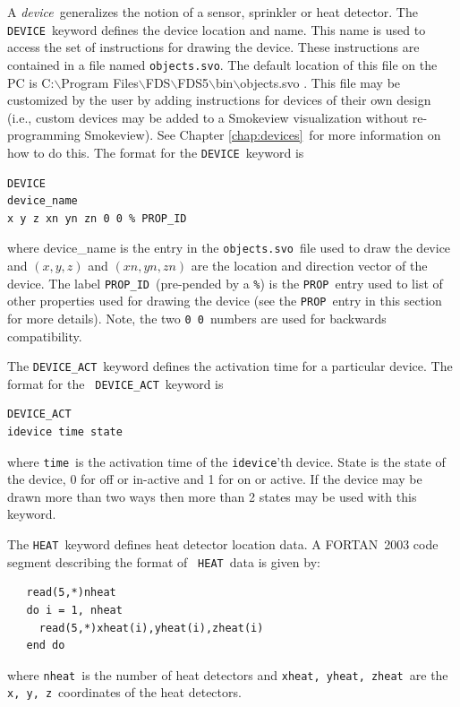 \documentclass[11pt,twoside]{book}
\begin{document}
A {\em device}\ generalizes the notion of a sensor,
sprinkler or heat detector.  The {\tt DEVICE}\ keyword defines the
device location and name.  This name is used to access the set of
instructions for drawing the device.  These instructions are
contained in a file named {\tt objects.svo}. The default location
of this file on the PC is
C:$\backslash$Program Files$\backslash$FDS$\backslash$FDS5$\backslash$bin$\backslash$objects.svo . This
file may be customized by the user by adding instructions for
devices of their own design (i.e., custom devices may be
added to a Smokeview visualization without re-programming
Smokeview). See Chapter \ref{chap:devices}\ for more information on how to do this. The
format for the {\tt DEVICE}\ keyword is

\begin{lstlisting}
DEVICE
device_name
x y z xn yn zn 0 0 % PROP_ID
\end{lstlisting}

\noindent where device\_name is the entry in the {\tt objects.svo}\ file used
to draw the device and $(x,y,z)$ and $(xn,yn,zn)$
are the location and direction vector of the device.
The label
{\tt PROP\_ID}\ (pre-pended by a {\tt \%}) is the {\tt PROP}\ entry used to
list of other properties used
for drawing the device
(see the {\tt PROP}\ entry in this section for more details).
Note, the two {\tt 0 0}\ numbers are used for backwards compatibility.

The {\tt DEVICE\_ACT}\ keyword defines the
activation time for a particular device. The format for the {\tt
DEVICE\_ACT}\ keyword is
\begin{lstlisting}
DEVICE_ACT
idevice time state
\end{lstlisting}
where {\tt time}\ is the activation time of the {\tt idevice}'th device.
State is the state of the device, 0 for off or in-active and 1 for
on or active.  If the device may be drawn more than two ways then
more than 2 states may be used with this keyword.

The {\tt HEAT}\ keyword defines heat detector location
data. A FORTAN~2003 code segment describing the format of {\tt
HEAT}\ data is given by:
\begin{lstlisting}
   read(5,*)nheat
   do i = 1, nheat
     read(5,*)xheat(i),yheat(i),zheat(i)
   end do
\end{lstlisting}
where {\tt nheat}\ is the number of heat detectors and
{\tt xheat, yheat, zheat}\ are the {\tt x, y, z}\
coordinates of the heat detectors.
\end{document}
